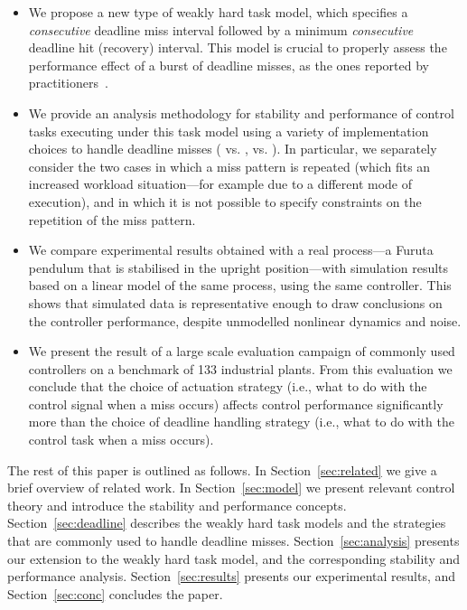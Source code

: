 \begin{itemize}
    \item We propose a new type of weakly hard task model, which specifies a \emph{consecutive} deadline miss interval followed by a minimum \emph{consecutive} deadline hit (recovery) interval.
        This model is crucial to properly assess the performance effect of a burst of deadline misses, as the ones reported by practitioners~\cite{Akesson:2020}.

    \item We provide an analysis methodology for stability and performance of control tasks executing under this task model using a variety of implementation choices to handle deadline misses (\tK{} vs. \tS{}, \tZ{} vs. \tH{}).
        In particular, we separately consider the two cases in which a miss pattern is repeated (which fits an increased workload situation---for example due to a different mode of execution), and in which it is not possible to specify constraints on the repetition of the miss pattern.

    \item We compare experimental results obtained with a real process---a Furuta pendulum that is stabilised in the upright position---with simulation results based on a linear model of the same process, using the same controller. 
        This shows that simulated data is representative enough to draw conclusions on the controller performance, despite unmodelled nonlinear dynamics and noise.

    \item We present the result of a large scale evaluation campaign of commonly used controllers on a benchmark of 133 industrial plants.
        From this evaluation we conclude that the choice of actuation strategy (i.e., what to do with the control signal when a miss occurs) affects control performance significantly more than the choice of deadline handling strategy (i.e., what to do with the control task when a miss occurs).

\end{itemize}

The rest of this paper is outlined as follows.
In Section~\ref{sec:related} we give a brief overview of related work.
In Section~\ref{sec:model} we present relevant control theory and introduce the stability and performance concepts.
Section~\ref{sec:deadline} describes the weakly hard task models and the strategies that are commonly used to handle deadline misses.
Section~\ref{sec:analysis} presents our extension to the weakly hard task model, and the corresponding stability and performance analysis.
Section~\ref{sec:results} presents our experimental results, and Section~\ref{sec:conc} concludes the paper.

